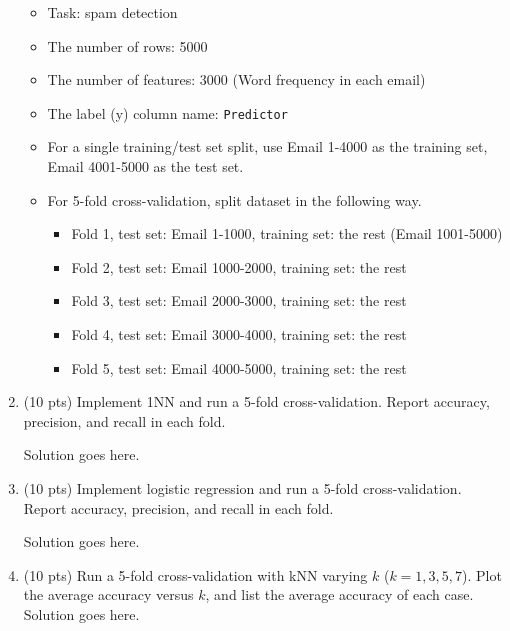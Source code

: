 \documentclass[a4paper]{article}
\theoremstyle{definition}
\newenvironment{soln}{
    \leavevmode\color{blue}\ignorespaces
}{}
\begin{document}
\begin{enumerate}
        \begin{itemize}
          \item Task: spam detection
          \item The number of rows: 5000
          \item The number of features: 3000 (Word frequency in each email)
          \item The label (y) column name: {\tt Predictor}
          \item For a single training/test set split, use Email 1-4000 as the training set, Email 4001-5000 as the test set.
          \item For 5-fold cross-validation, split dataset in the following way.
                \begin{itemize}
                  \item Fold 1, test set: Email 1-1000, training set: the rest (Email 1001-5000)
                  \item Fold 2, test set: Email 1000-2000, training set: the rest
                  \item Fold 3, test set: Email 2000-3000, training set: the rest
                  \item Fold 4, test set: Email 3000-4000, training set: the rest
                  \item Fold 5, test set: Email 4000-5000, training set: the rest
                \end{itemize}
        \end{itemize}

  \item (10 pts) Implement 1NN and run a 5-fold cross-validation. Report accuracy, precision, and recall in each fold.

        \begin{soln}  Solution goes here. \end{soln}

  \item (10 pts) Implement logistic regression and run a 5-fold cross-validation. Report accuracy, precision, and recall in each fold.

        \begin{soln}  Solution goes here. \end{soln}

  \item (10 pts) Run a 5-fold cross-validation with kNN varying $k$ ($k=1, 3, 5, 7$). Plot the average accuracy versus $k$, and list the average accuracy of each case.
        \begin{soln}  Solution goes here. \end{soln}


\end{enumerate}
\end{document}
